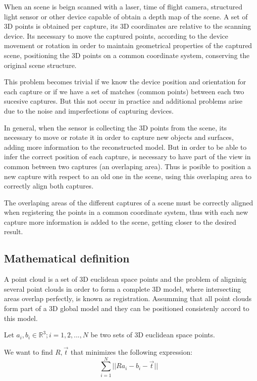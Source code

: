 When an scene is beign scanned with a laser, time of flight camera, structured 
light sensor or other device capable of obtain a depth map of the scene.
 A set of 3D points is obtained per capture, its 3D coordinates 
are relative to the scanning device. Its necessary to move the captured points, 
according to the device movement or rotation in order to maintain geometrical properties of the captured scene,
 positioning the 3D points on a common coordinate system, conserving 
the original scene structure. 

This problem becomes trivial if we know the device position and orientation 
for each capture or if we have a set of matches (common points)  between each two sucesive 
captures. But this not occur in practice and additional problems arise due 
to the noise and imperfections of capturing devices.


In general, when the sensor is collecting the 3D points from the scene, 
 its necessary to move or rotate it in order to capture new objects and surfaces,
 adding more information to the reconstructed model. But in order to be 
able to infer the correct position of each capture, is necessary to have part 
of the view in common between two captures (an overlaping area). Thus is posible to position a 
new capture with respect to an old one in the scene, using this overlaping 
area to correctly align both captures.
 
The overlaping areas of the different captures of a scene must be correctly 
aligned when registering the points in a common coordinate system, 
thus with each new capture more information is added to the scene, 
getting closer to the desired result. 

\subsection{Mathematical definition}

A point cloud is a set of 3D euclidean space points and the problem of aligninig several point clouds 
in order to form a complete 3D model, where intersecting areas overlap perfectly, 
is known as registration. Assumming that all point clouds form part of a 3D global model and they can be 
 positioned  consistenly accord to this model.

Let  ${a_i},{b_i} \in \mathbb{R}^3;i = 1,2,...,N$ be two sets of 3D euclidean space points.

We want to find $R,\vec{t}$ that minimizes the following expression:
$$
\sum\limits_{i=1}^N || Ra_i - b_i - \vec{t} ||
$$


